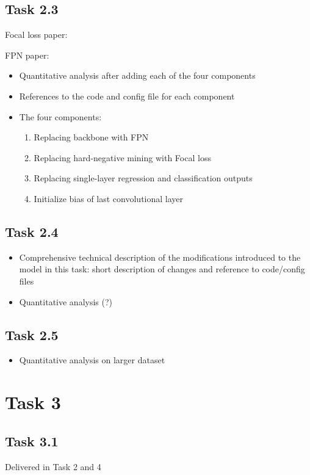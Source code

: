 \documentclass{article}
\begin{document}
\subsection*{Task 2.3}
Focal loss paper: \cite{lin2017focal}

FPN paper: \cite{lin2017feature}

\begin{itemize}
    \item Quantitative analysis after adding each of the four components
    \item References to the code and config file for each component
    \item The four components:
    \begin{enumerate}
        \item Replacing backbone with FPN
        \item Replacing hard-negative mining with Focal loss
        \item Replacing single-layer regression and classification outputs
        \item Initialize bias of last convolutional layer
    \end{enumerate}
\end{itemize}

\subsection*{Task 2.4}
\begin{itemize}
    \item Comprehensive technical description of the modifications introduced to the model in this task: short description of changes and reference to code/config files
    \item Quantitative analysis (?)
\end{itemize}

\subsection*{Task 2.5}
\begin{itemize}
    \item Quantitative analysis on larger dataset
\end{itemize}

\section*{Task 3}

\subsection*{Task 3.1}
Delivered in Task 2 and 4
\end{document}
